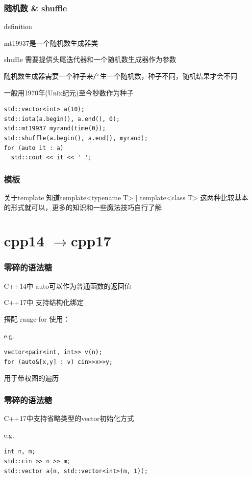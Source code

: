 \documentclass{beamer}
\begin{document}
  \begin{frame}[fragile]
    \frametitle{随机数 \& shuffle}
    \begin{block}{definition}
  
      mt19937是一个随机数生成器类

      shuffle 需要提供头尾迭代器和一个随机数生成器作为参数

      随机数生成器需要一个种子来产生一个随机数，种子不同，随机结果才会不同

      一般用1970年(Unix纪元)至今秒数作为种子
      
      \begin{lstlisting}  
std::vector<int> a(10);
std::iota(a.begin(), a.end(), 0);
std::mt19937 myrand(time(0));
std::shuffle(a.begin(), a.end(), myrand);
for (auto it : a)
  std::cout << it << ' ';
      \end{lstlisting}
    \end{block}
  \end{frame}

  \begin{frame}
    \frametitle{模板}
      \begin{block}{关于template}
        知道template<typename T> $\mid$ template<class T>
        这两种比较基本的形式就可以，更多的知识和一些魔法技巧自行了解
      \end{block}
  \end{frame}

  \section{cpp14 \texorpdfstring{$\to$}\ cpp17}

  \begin{frame}[fragile]
    \frametitle{零碎的语法糖}
    
    C++14中 auto可以作为普通函数的返回值

    \vspace*{1\baselineskip}
    
    C++17中 支持结构化绑定
    
    搭配 range-for 使用：
    \begin{block}{e.g.}
      \begin{lstlisting}
vector<pair<int, int>> v(n);
for (auto&[x,y] : v) cin>>x>>y;
      \end{lstlisting}
    \end{block}
    
    用于带权图的遍历

  \end{frame}
  \begin{frame}[fragile]
    \frametitle{零碎的语法糖}

    C++17中支持省略类型的vector初始化方式

    \begin{block}{e.g.}
      \begin{lstlisting}
int n, m;
std::cin >> n >> m;
std::vector a(n, std::vector<int>(m, 1));
      \end{lstlisting}
    \end{block}
  \end{frame}
\end{document}
